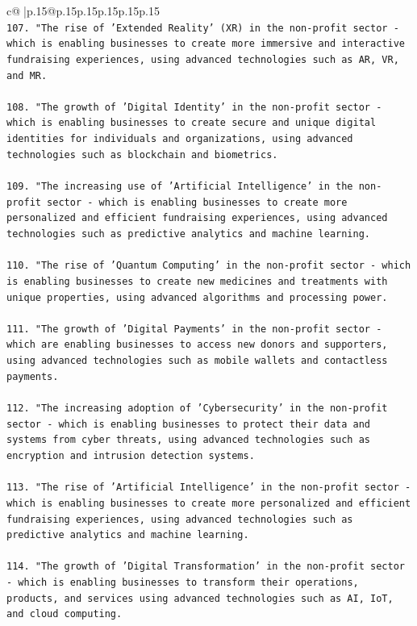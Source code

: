 \documentclass{article}
\begin{document}
{\begin{supertabular}{c@{$\;$}|p{.15\linewidth}@{}p{.15\linewidth}p{.15\linewidth}p{.15\linewidth}p{.15\linewidth}p{.15\linewidth}}
{{{\\ 
\texttt{107. "The rise of 'Extended Reality' (XR) in the non{-}profit sector {-} which is enabling businesses to create more immersive and interactive fundraising experiences, using advanced technologies such as AR, VR, and MR.} \\
\\ 
\texttt{108. "The growth of 'Digital Identity' in the non{-}profit sector {-} which is enabling businesses to create secure and unique digital identities for individuals and organizations, using advanced technologies such as blockchain and biometrics.} \\
\\ 
\texttt{109. "The increasing use of 'Artificial Intelligence' in the non{-}profit sector {-} which is enabling businesses to create more personalized and efficient fundraising experiences, using advanced technologies such as predictive analytics and machine learning.} \\
\\ 
\texttt{110. "The rise of 'Quantum Computing' in the non{-}profit sector {-} which is enabling businesses to create new medicines and treatments with unique properties, using advanced algorithms and processing power.} \\
\\ 
\texttt{111. "The growth of 'Digital Payments' in the non{-}profit sector {-} which are enabling businesses to access new donors and supporters, using advanced technologies such as mobile wallets and contactless payments.} \\
\\ 
\texttt{112. "The increasing adoption of 'Cybersecurity' in the non{-}profit sector {-} which is enabling businesses to protect their data and systems from cyber threats, using advanced technologies such as encryption and intrusion detection systems.} \\
\\ 
\texttt{113. "The rise of 'Artificial Intelligence' in the non{-}profit sector {-} which is enabling businesses to create more personalized and efficient fundraising experiences, using advanced technologies such as predictive analytics and machine learning.} \\
\\ 
\texttt{114. "The growth of 'Digital Transformation' in the non{-}profit sector {-} which is enabling businesses to transform their operations, products, and services using advanced technologies such as AI, IoT, and cloud computing.} \\
}}}
\end{supertabular}}
\end{document}

